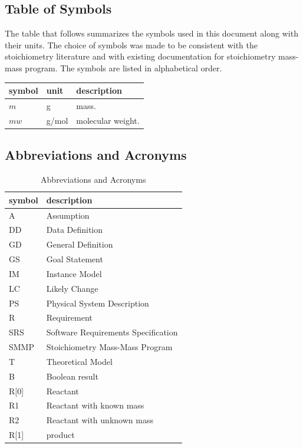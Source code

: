 \documentclass[12pt]{article}
\begin{document}
\subsection{Table of Symbols}

The table that follows summarizes the symbols used in this document along with
their units. The choice of symbols was made to be consistent with the stoichiometry 
literature and with existing documentation for stoichiometry mass-mass program. The symbols are listed in alphabetical order.

\renewcommand{\arraystretch}{1.2}
\noindent \begin{longtable*}{l l p{12cm}} \toprule
\endlastfoot
\textbf{symbol} & \textbf{unit} & \textbf{description}\\
\midrule 
$m$ & \si[per-mode=symbol] {\gram} & mass.\\
$mw$ & \si[per-mode=symbol] {\gram/\mol} & molecular weight.\\ 
 
\bottomrule
\end{longtable*}

\subsection{Abbreviations and Acronyms}

\renewcommand{\arraystretch}{1.2}
\begin{table}[ht]
\begin{tabular}{l l} 
  \toprule		
  \textbf{symbol} & \textbf{description}\\
  \midrule 
  A & Assumption\\
  DD & Data Definition\\
  GD & General Definition\\
  GS & Goal Statement\\
  IM & Instance Model\\
  LC & Likely Change\\
  PS & Physical System Description\\
  R & Requirement\\
  SRS & Software Requirements Specification\\
 SMMP & Stoichiometry Mass-Mass Program\\
  T & Theoretical Model\\
  B & Boolean result\\
  R[0] & Reactant \\
  R1 & Reactant with known mass\\
  R2 & Reactant with unknown mass\\
  R[1] & product \\
  \bottomrule
  \end{tabular}
  \caption{ Abbreviations and Acronyms}
 \end{table}
\end{document}
